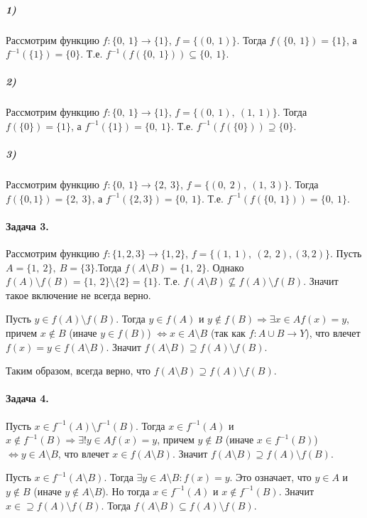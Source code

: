 \documentclass{article}
\begin{document}
		\subparagraph{1)}
		 Рассмотрим функцию $f: \{0,\ 1\} \rightarrow \{1\}$, $f = \{(0,\ 1)\}$.
		 Тогда $f(\{0,\ 1\}) = \{1\}$, а $f^{-1}(\{1\}) = \{0\}$. Т.е. $f^{-1}(f(\{0,\ 1\})) \subseteq \{0,\ 1\}$.
		
		\subparagraph{2)}
		Рассмотрим функцию $f: \{0,\ 1\} \rightarrow \{1\}$, $f = \{(0,\ 1),\ (1,\ 1)\}$. 
		Тогда $f(\{0 \}) = \{1 \} $, а $f^{-1}(\{1\}) = \{0,\ 1\} $. Т.е. $f^{-1}(f(\{0\})) \supseteq \{0\} $.
		
		\subparagraph{3)}	
		Рассмотрим функцию $f: \{0,\ 1\} \rightarrow \{2,\ 3\}$, $f = \{(0,\ 2),\ (1,\ 3)\}$. Тогда $f(\{0, 1\}) = \{2,\ 3\} $, а $f^{-1}(\{2, 3\}) = \{0,\ 1\} $. Т.е. $f^{-1}(f(\{0,\ 1\})) = \{0,\ 1\} $.
		
		\paragraph{Задача 3.}
	    Рассмотрим функцию $f: \{1, 2, 3\} \rightarrow \{1, 2\}$, $f = \{(1,\ 1),\ (2,\ 2), (3, 2)\}$. Пусть $A = \{1,\ 2\},\ B = \{3\}$.Тогда $f(A \setminus B) = \{1,\ 2\}$. Однако $f(A) \setminus f(B) = \{1,\ 2\} \setminus \{2\} = \{1\}$. Т.е. $f(A \setminus B) \not\subseteq f(A) \setminus f(B)$. Значит такое включение не всегда верно.
	    
	    Пусть $y \in f(A) \setminus f(B)$. Тогда $y \in f(A)$ и $y \notin f(B) \Rightarrow \exists x \in A f(x) = y$, причем $x \notin B$ (иначе $y \in f(B)$) $\Leftrightarrow x \in A \setminus B$ (так как $f: A \cup B \rightarrow Y$), что влечет $f(x) = y \in f(A \setminus B)$. Значит $f(A \setminus B) \supseteq f(A) \setminus f(B)$.
	    
	    Таким образом, всегда верно, что $f(A \setminus B) \supseteq f(A) \setminus f(B)$.
	    
	    \paragraph{Задача 4.}
		Пусть $x \in f^{-1}(A) \setminus f^{-1}(B)$. Тогда $x \in f^{-1}(A)$ и $x \notin f^{-1}(B) \Rightarrow \exists! y \in A f(x) = y$, причем $y \notin B$ (иначе $x \in f^{-1}(B)$) $\Leftrightarrow y \in A \setminus B$, что влечет $x \in f(A \setminus B)$. Значит $f(A \setminus B) \supseteq f(A) \setminus f(B)$.
		
		Пусть $x \in f^{-1}(A \setminus B)$. Тогда $\exists y \in A \setminus B: f(x) = y$. Это означает, что $y \in A$ и $y \notin B$ (иначе $y \notin A \setminus B$). Но тогда $x \in f^{-1}(A)$ и $x \notin f^{-1}(B)$. Значит $x \in \supseteq f(A) \setminus f(B)$. Тогда $f(A \setminus B) \subseteq f(A) \setminus f(B)$.
		
\end{document}
